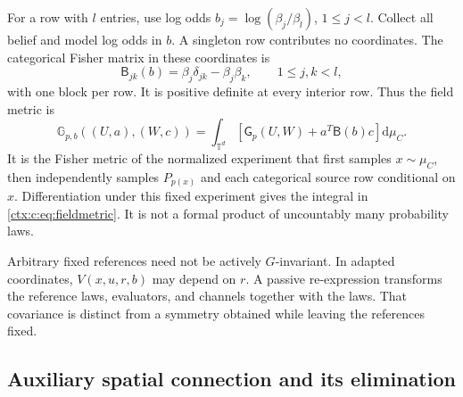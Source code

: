 For a row with $l$ entries, use log odds $b_j=\log(\beta_j/\beta_l)$, $1\leq j<l$. Collect all belief and model log odds in $b$. A singleton row contributes no coordinates. The categorical Fisher matrix in these coordinates is
\begin{equation}
 \mathsf B_{jk}(b)=\beta_j\delta_{jk}-\beta_j\beta_k,
 \qquad 1\leq j,k<l,
 \label{ctx:c:eq:B}
\end{equation}
with one block per row. It is positive definite at every interior row. Thus the field metric is
\begin{equation}
 \mathbb G_{p,b}((U,a),(W,c))
 =\int_{\mathbb T^d}[\mathsf G_p(U,W)+a^T\mathsf B(b)c]\mathrm d\mu_C.
 \label{ctx:c:eq:fieldmetric}
\end{equation}
It is the Fisher metric of the normalized experiment that first samples $x\sim\mu_C$, then independently samples $P_{p(x)}$ and each categorical source row conditional on $x$. Differentiation under this fixed experiment gives the integral in \cref{ctx:c:eq:fieldmetric}. It is not a formal product of uncountably many probability laws.

Arbitrary fixed references need not be actively $G$-invariant. In adapted coordinates, $V(x,u,r,b)$ may depend on $r$. A passive re-expression transforms the reference laws, evaluators, and channels together with the laws. That covariance is distinct from a symmetry obtained while leaving the references fixed.

\subsection{Auxiliary spatial connection and its elimination}

